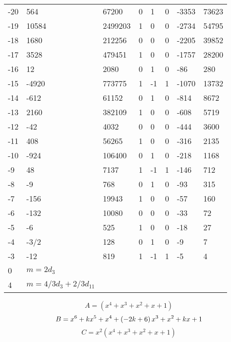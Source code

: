 \documentclass{amsart}
\begin{document}
\begin{longtable}{|l|l|l|lllll|}
-20&564&67200&0&1&0&-3353&73623\\
-19&10584&2499203&1&0&0&-2734&54795\\
-18&1680&212256&0&0&0&-2205&39852\\
-17&3528&479451&1&0&0&-1757&28200\\
-16&12&2080&0&1&0&-86&280\\
-15&-4920&773775&1&-1&1&-1070&13732\\
-14&-612&61152&0&1&0&-814&8672\\
-13&2160&382109&1&0&0&-608&5719\\
-12&-42&4032&0&0&0&-444&3600\\
-11&408&56265&1&0&0&-316&2135\\
-10&-924&106400&0&1&0&-218&1168\\
-9&48&7137&1&-1&1&-146&712\\
-8&-9&768&0&1&0&-93&315\\
-7&-156&19943&1&0&0&-57&160\\
-6&-132&10080&0&0&0&-33&72\\
-5&-6&525&1&0&0&-18&27\\
-4&-3/2&128&0&1&0&-9&7\\
-3&-12&819&1&-1&1&-5&4\\
0&$m=2d_{3}$&&\multicolumn{5}{c|}{}\\
4&$m=4/3d_{3}+2/3d_{11}$&&\multicolumn{5}{c|}{}\\
\hline
\end{longtable}
$$A=(x^4
 + x^3
 + x^2
 + x
 + 1)$$
$$B=x^6
 + k\*x^5
 + x^4
 + \left(-2\*k
 + 6\right) \*x^3
 + x^2
 + k\*x
 + 1$$
$$C=x^2(x^4
 + x^3
 + x^2
 + x
 + 1)$$
\end{document}
